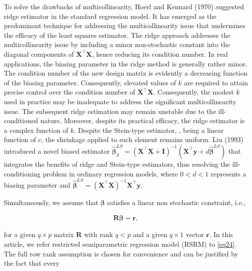 \documentclass[10pt,twoside]{article}
\numberwithin{equation}{section}
\begin{document}
To solve the drawbacks of multicollinearity, Hoerl and Kennard (1970) suggested ridge estimator in the standard regression model. It has emerged as the predominant technique for addressing the multicollinearity issue that undermines the efficacy of the least squares estimator. The ridge approach addresses the multicollinearity issue by including a minor non-stochastic constant into the diagonal components of $\boldsymbol{X}^\top\boldsymbol{X}$, hence reducing its condition number. In real applications, the biasing parameter in the ridge method is generally rather minor. The condition number of the new design matrix  is evidently a decreasing function of the biasing parameter. Consequently, elevated values of $k$ are required to attain precise control over the condition number of $\boldsymbol{X}^\top\boldsymbol{X}$. Consequently, the modest $k$ used in practice may be inadequate to address the significant multicollinearity issue. The subsequent ridge estimation may remain unstable due to the ill-conditioned nature. Moreover, despite its practical efficacy, the ridge estimator is a complex function of $k$. Despite the Stein-type estimator,  , being a linear function of $c$, the shrinkage applied to each element remains uniform. Liu (1993) introduced a novel biased estimator $\hat{\boldsymbol\beta}_d^{LS}=(\boldsymbol{X}^\top\boldsymbol{X}+\boldsymbol I)^{-1}(\boldsymbol{X}^\top\boldsymbol{y}+d\hat{\boldsymbol\beta}^{LS})$ that integrates the benefits of ridge and Stein-type estimators, thus resolving the ill-conditioning problem in ordinary regression models, where $0 < d < 1$ represents a biasing parameter and $\hat{\boldsymbol\beta}^{LS}=(\boldsymbol{X}^\top\boldsymbol{X})^{-1}\boldsymbol{X}^\top\boldsymbol{y}$.



Simultaneously, we assume that $\boldsymbol\beta$ satisfies a linear non stochastic constraint, i.e.,

\begin{eqnarray}\label{eq24}

\boldsymbol R\boldsymbol\beta=\boldsymbol r,

\end{eqnarray}

for a given $q\times p$ matrix $\boldsymbol R$ with rank $q<p$ and a given $q\times1$ vector $\boldsymbol r$. In this article, we refer restricted semiparametric regression model (RSRM) to \eqref{eq24}. The full row rank assumption is chosen for convenience and can be justified by the fact that every
\end{document}
